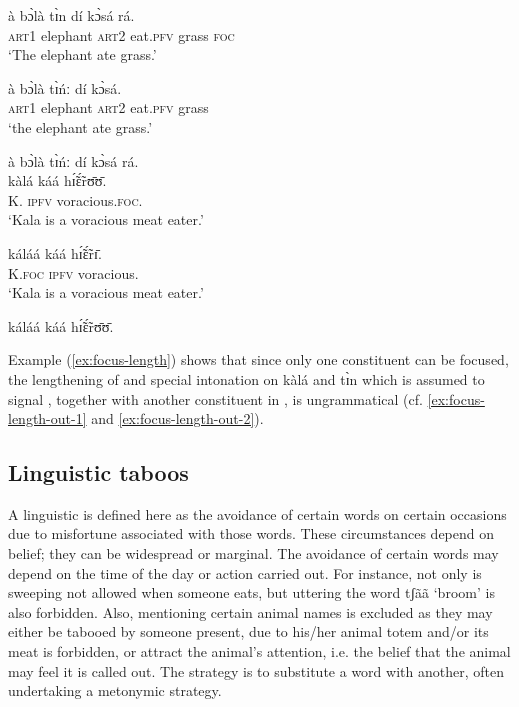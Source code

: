 \begin{exe}
\begin{exe}
\begin{exe}
\begin{exe}
\begin{exe}
\begin{exe}
\begin{exe}
\begin{exe}
\begin{exe}
\begin{exe}
\begin{exe}
\begin{exe}
 
 \ea
\gll  à bɔ̀là tɪ̀n dí kɔ̀sá rá.\\
\textsc{art1}  elephant \textsc{art2} eat.\textsc{pfv} grass \textsc{foc}\\
\glt  `The elephant ate {\sc grass}.'

 \ex
\gll à bɔ̀là tɪ̀ńː    dí kɔ̀sá.\\
\textsc{art1} elephant \textsc{art2} eat.\textsc{pfv} grass \\
\glt  `{\sc the elephant} ate grass.'

 \ex\label{ex:focus-length-out-1}  \textasteriskcentered à bɔ̀là tɪ̀ńː  dí kɔ̀sá rá.\\
 
 \ex
\gll  kàlá káá hɪ̃́ɛ̃́rʊ̄ʊ̄.\\
K. \textsc{ipfv} voracious.\textsc{foc}.\\
\glt  `Kala is {\sc a voracious meat eater}.'

 \ex
\gll  káláá káá hɪ̃́ɛ̃́rɪ̄.\\
K.\textsc{foc} \textsc{ipfv} voracious.\\
\glt  `{\sc Kala} is a voracious meat eater.'

 \ex\label{ex:focus-length-out-2}  \textasteriskcentered káláá káá hɪ̃́ɛ̃́rʊ̄ʊ̄.\\
\z 
 \z
 
 Example (\ref{ex:focus-length}) shows that since only one constituent can be focused, the  lengthening of and special intonation on   {\sls kàlá} and {\sls tɪ̀n}  which is assumed to signal , together with another constituent in , is ungrammatical (cf. \ref{ex:focus-length-out-1} and  \ref{ex:focus-length-out-2}). 


\subsection{Linguistic taboos}
\label{sec:GRM-ling-taboo}


A linguistic  is defined here as the avoidance of certain words on certain occasions due to  misfortune associated with those words. These circumstances depend on belief; they can be widespread or marginal. The avoidance of certain words may depend on the time of the day or action carried out. For instance, not only  is sweeping  not allowed when someone eats, but uttering the word {\sls tʃãã} `broom' is also forbidden. Also, mentioning certain animal names is excluded as they may either be tabooed by someone present, due to his/her animal totem and/or its meat is forbidden,  or attract the animal's attention, i.e. the belief that the  animal may feel it is called out. The strategy is to substitute a word with another, often undertaking a  metonymic strategy. 


\end{exe}
\end{exe}
\end{exe}
\end{exe}
\end{exe}
\end{exe}
\end{exe}
\end{exe}
\end{exe}
\end{exe}
\end{exe}
\end{exe}
